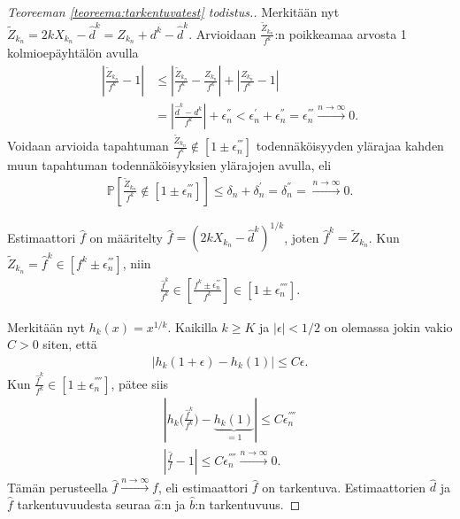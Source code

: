 \documentclass[finnish,12pt,a4paper,pdftex,sci,utf8]{aaltothesis}
\begin{document}
\begin{proof}[Teoreeman \ref{teoreema:tarkentuvatest} todistus.]
	Merkitään nyt $\tilde{Z}_{k_n} = 2kX_{k_n} - \hat{d}^k = Z_{k_n} + d^k - \hat{d}^k$. Arvioidaan $\frac{\tilde{Z}_{k_n}}{f^k}$:n poikkeamaa arvosta 1 kolmioepäyhtälön avulla
	\begin{align*}
		|\frac{\tilde{Z}_{k_n}}{f^k} - 1| &\leq |\frac{\tilde{Z}_{k_n}}{f^k} - \frac{Z_{k_n}}{f^k}| + |\frac{Z_{k_n}}{f^k} - 1| \\
		& = |\frac{\hat{d}^k - d^k}{f^k}| + \epsilon_{n}^{''} < \epsilon_{n}^{'} + \epsilon_{n}^{''} = \epsilon_{n}^{'''} \xrightarrow{n \rightarrow \infty} 0.
	\end{align*}
	Voidaan arvioida tapahtuman $\frac{\tilde{Z}_{k_n}}{f^k} \notin [1 \pm \epsilon_{n}^{'''}]$ todennäköisyyden ylärajaa kahden muun tapahtuman todennäköisyyksien ylärajojen avulla, eli
	\begin{align*}
		\mathbb{P}[\frac{\tilde{Z}_{k_n}}{f^k} \notin [1 \pm \epsilon_{n}^{'''}]] \leq \delta_{n} + \delta_{n}^{'} = \delta_{n}^{''} = \xrightarrow{n \rightarrow \infty} 0.
	\end{align*}

	Estimaattori $\hat{f}$ on määritelty $\hat{f} = (2kX_{k_n} - \hat{d}^k)^{1/k}$, joten $\hat{f}^k = \tilde{Z}_{k_n}$. Kun \\ $\tilde{Z}_{k_n} = \hat{f}^k \in [f^k \pm \epsilon_{n}^{'''}]$, niin
	\begin{align*}
		\frac{\hat{f}^k}{f^k} \in [\frac{{f}^k \pm \epsilon_{n}^{'''}}{f^k}] \in [1 \pm \epsilon_{n}^{''''}].
	\end{align*}

	Merkitään nyt $h_k(x) = x^{1/k}$. Kaikilla $k \geq K$ ja $|\epsilon| < 1/2$ on olemassa jokin vakio $C > 0$ siten, että
	\begin{align*}
		|h_k(1+\epsilon) - h_k(1)| \leq C \epsilon.
	\end{align*}
	Kun $\frac{\hat{f}^k}{f^k} \in [1 \pm \epsilon_{n}^{''''}]$, pätee siis
	\begin{align*}
		|h_k \big(\frac{\hat{f}^k}{f^k} \big) - \underbrace{h_k(1)}_{= 1} | \leq C \epsilon_{n}^{''''} \\
		|\frac{\hat{f}}{f} - 1| \leq C \epsilon_{n}^{''''} \xrightarrow{n \rightarrow \infty} 0.
	\end{align*}
	Tämän perusteella $\hat{f} \xrightarrow{n \rightarrow \infty} f$, eli estimaattori $\hat{f}$ on tarkentuva.
	Estimaattorien $\hat{d}$ ja$\hat{f}$ tarkentuvuudesta seuraa $\hat{a}$:n ja $\hat{b}$:n tarkentuvuus.
\end{proof}

\clearpage
\end{document}
